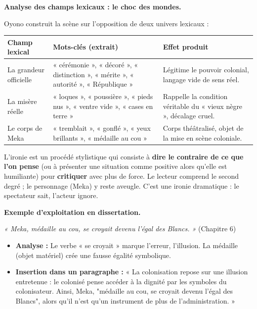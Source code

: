 \documentclass[11pt]{article}
\newcommand{\cle}[1]{{\popxbold\color{popdark}#1}}
\begin{document}
\textbf{Analyse des champs lexicaux : le choc des mondes.}\par
Oyono construit la scène sur l'opposition de deux univers lexicaux :
\begin{center}
\begin{tabularx}{\linewidth}{|l|X|X|}
\hline
\rowcolor{popblueL}
\textbf{Champ lexical} & \textbf{Mots-clés (extrait)} & \textbf{Effet produit} \\
\hline
La grandeur officielle & « cérémonie », « décoré », « distinction », « mérite », « autorité », « République » & Légitime le pouvoir colonial, langage vide de sens réel. \\
\hline
La misère réelle & « loques », « poussière », « pieds nus », « ventre vide », « cases en terre » & Rappelle la condition véritable du « vieux nègre », décalage cruel. \\
\hline
Le corps de Meka & « tremblait », « gonflé », « yeux brillants », « médaille au cou » & Corps théâtralisé, objet de la mise en scène coloniale. \\
\hline
\end{tabularx}
\end{center}

\begin{definition}
L'\cle{ironie} est un procédé stylistique qui consiste à \textbf{dire le contraire de ce que l'on pense} (ou à présenter une situation comme positive alors qu'elle est humiliante) pour \textbf{critiquer} avec plus de force. Le lecteur comprend le second degré ; le personnage (Meka) y reste aveugle. C'est une \cle{ironie dramatique} : le spectateur sait, l'acteur ignore.
\end{definition}

\textbf{Exemple d'exploitation en dissertation.}\par
\begin{exemplebox}
\textit{« Meka, médaille au cou, se croyait devenu l'égal des Blancs. »} (Chapitre 6)
\begin{itemize}
    \item \textbf{Analyse :} Le verbe « se croyait » marque l'erreur, l'illusion. La médaille (objet matériel) crée une fausse égalité symbolique.
    \item \textbf{Insertion dans un paragraphe :} « La colonisation repose sur une illusion entretenue : le colonisé pense accéder à la dignité par les symboles du colonisateur. Ainsi, Meka, "médaille au cou, se croyait devenu l'égal des Blancs", alors qu'il n'est qu'un instrument de plus de l'administration. »
\end{itemize}
\end{exemplebox}
\end{document}

